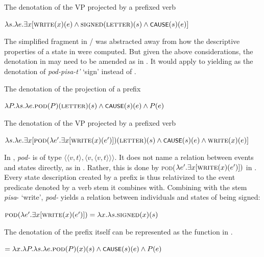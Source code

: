 \documentclass[output=paper,colorlinks,citecolor=brown]{langscibook}
\begin{document}
\ex      The denotation of the VP projected by a prefixed verb\label{ex:tatevosov:112c}

$\lambda s.\lambda e.\exists x [\textsc{write}(x)(e) \wedge \textsc{signed}(\textsc{letter})(s)\wedge \cnst{cause}(s)(e) ]$
\z
\z

\noindent The simplified fragment in / was abstracted away from how the descriptive properties of a state in  were computed. But given the above considerations, the denotation in  may need to be amended as in . It would apply to  yielding  as the denotation of \textit{pod-pisa-t’} ‘sign’ instead of .

\ea\label{ex:tatevosov:113}
\ea      The denotation of the projection of a prefix\label{ex:tatevosov:113a}

$\lambda P.\lambda s. \lambda e. \textsc{pod}(P)(\textsc{letter})(s) \wedge \cnst{cause}(s)(e) \wedge P(e)$

\ex      The denotation of the VP projected by a prefixed verb\label{ex:tatevosov:113b}

$\lambda s.\lambda e.\exists x [ \textsc{pod}(\lambda e'.\exists x[\textsc{write}(x)(e')])(\textsc{letter})(s) \wedge \cnst{cause}(s)(e) \wedge \textsc{write}(x)(e) ]$
\z
\z

\noindent In , \textit{pod-} is of type $\langle\langle v,t \rangle, \langle v, \langle v,t\rangle\rangle\rangle$. It does not name a relation between events and states directly, as in . Rather, this is done by \textsc{pod}($\lambda e'.\exists x [\textsc{write}(x)(e')])$ in . Every state description created by a prefix is thus relativized to the event predicate denoted by  a verb stem it combines with. Combining with the stem \textit{pisa}- ‘write’, \textit{pod-} yields a relation between individuals and states of being signed:

\ea   $\textsc{pod}(\lambda e'.\exists x [\textsc{write}(x)(e')]) = \lambda x.\lambda s.\textsc{signed}(x)(s)$\label{ex:tatevosov:114}
\z

\noindent The denotation of the prefix itself can be represented as the function in .

\ea   {} $= \lambda x.\lambda P.\lambda s.\lambda e. \textsc{pod}(P)(x)(s) \wedge \cnst{cause}(s)(e) \wedge P(e)$\label{ex:tatevosov:115}
\z
\end{document}
